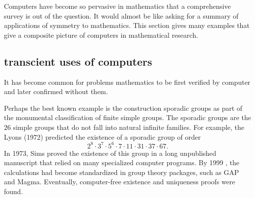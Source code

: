 \documentclass{llncs}
\begin{document}









\bigskip

Computers have become so pervasive in mathematics that a comprehensive
survey is out of the question.  It would almost be like asking for a
summary of applications of symmetry to mathematics.  This section
gives many examples that give a composite picture of computers in
mathematical research.


\subsection{transcient uses of computers}

It has become common for problems mathematics to be first verified by
computer and later confirmed without them.

Perhaps the best known example is the construction sporadic groups as
part of the monumental classification of finite simple groups.  The
sporadic groups are the $26$ simple groups that do not fall into
natural infinite families.  For example, the Lyons (1972) predicted
the existence of a sporadic group of order
\[
2^ 8\cdot 3^7\cdot 5^6\cdot  7\cdot 11 \cdot 31 \cdot 37 \cdot 67.
\]
In 1973, Sims proved the existence of this group in a long unpublished
manuscript that relied on many specialized computer programs.
By 1999 \cite{HS99}, the calculations had become standardized in group theory
packages, such as GAP and Magma.
Eventually,  computer-free existence \cite{MParker} and uniqueness \cite{AS92} proofs were found.

\end{document}
